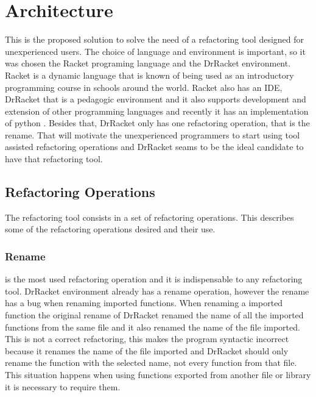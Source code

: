 
% 
% 

\section{Architecture}

This is the proposed solution to solve the need of a refactoring tool designed for unexperienced users.
The choice of language and environment is important, so it was chosen the Racket programing language and the DrRacket environment.
Racket is a dynamic language that is known of being used as an introductory programming course in schools around the world. 
Racket also has an IDE, DrRacket that is a pedagogic environment \cite{drscheme_pegadogy} and it also supports development and extension of other programming languages \cite{tobin2011languages} and recently it has an implementation of python \cite{ramos2014implementation}.
Besides that, DrRacket only has one refactoring operation, that is the rename.
That will motivate the unexperienced programmers to start using tool assisted refactoring operations and DrRacket seams to be the ideal candidate to have that refactoring tool.


\subsection{Refactoring Operations}
The refactoring tool consists in a set of refactoring operations.
This describes some of the refactoring operations desired and their use.

\subsubsection{Rename}
\label{ssub:Rename}
is the most used refactoring operation and it is indispensable to any refactoring tool.
DrRacket environment already has a rename operation, however the rename has a bug when renaming imported functions.
When renaming a imported function the original rename of DrRacket renamed the name of all the imported functions from the same file and it also renamed the name of the file imported.
This is not a correct refactoring, this makes the program syntactic incorrect because it renames the name of the file imported and DrRacket should only rename the function with the selected name, not every function from that file.
This situation happens when using functions exported from another file or library it is necessary to require them.


